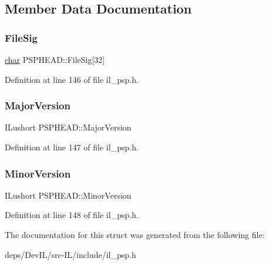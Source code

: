 \subsection{Member Data Documentation}
\mbox{\label{structPSPHEAD_a2725e88d92ed72d8b98cc0c75aee7012}} 
\subsubsection{\texorpdfstring{File\+Sig}{FileSig}}
{\footnotesize\ttfamily \hyperlink{classchar}{char} P\+S\+P\+H\+E\+A\+D\+::\+File\+Sig\mbox{[}32\mbox{]}}



Definition at line 146 of file il\+\_\+psp.\+h.

\mbox{\label{structPSPHEAD_a8ff2d7beb0fe666c9f8513758f7f7086}} 
\subsubsection{\texorpdfstring{Major\+Version}{MajorVersion}}
{\footnotesize\ttfamily I\+Lushort P\+S\+P\+H\+E\+A\+D\+::\+Major\+Version}



Definition at line 147 of file il\+\_\+psp.\+h.

\mbox{\label{structPSPHEAD_a34701bcf5a1dcfa00baeb4079ba7397d}} 
\subsubsection{\texorpdfstring{Minor\+Version}{MinorVersion}}
{\footnotesize\ttfamily I\+Lushort P\+S\+P\+H\+E\+A\+D\+::\+Minor\+Version}



Definition at line 148 of file il\+\_\+psp.\+h.



The documentation for this struct was generated from the following file\+:\begin{DoxyCompactItemize}
\item 
deps/\+Dev\+I\+L/src-\/\+I\+L/include/il\+\_\+psp.\+h\end{DoxyCompactItemize}
